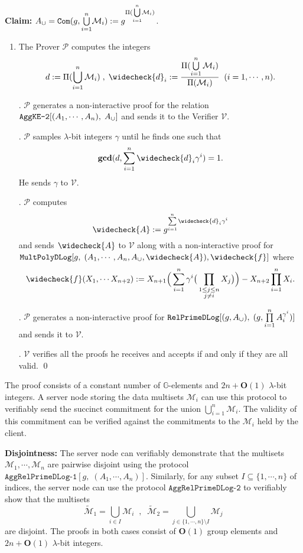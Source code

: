 \documentclass[11pt, lettersize, notitlepage, leqno, footskip=0.6cm]{article}
\newcommand{\pl}{\prod\limits}
\newcommand{\slim}{\sum\limits}
\newcommand{\ttt}{\texttt}
\newcommand{\bG}{\mathbb{G}}
\newcommand{\wti}{\widetilde}
\newcommand{\mc}{\mathcal}
\newcommand{\mbf}{\mathbf}
\newcommand{\sm}{\setminus}
\newcommand{\lam}{\lambda}
\newcommand{\weck}{\widecheck}
\newcommand{\sub}{\subseteq}
\newcommand{\bO}{\mbf{O}}
\newcommand{\mP}{\mc{P}}
\newcommand{\V}{\mc{V}}
\newcommand{\mcM}{\mc{M}}
\newcommand{\vs}{\vspace{-0.15cm}}
\newcommand{\noin}{\noindent}
\newcommand{\GCD}{\mbf{gcd}}
\numberwithin{equation}{section}
\begin{document}
\noin \textbf{Claim:} $A_{\tt{\cup}} = \protect{\verb|Com|}(g, {\bigcup\limits_{i=1}^n} \mc{M}_i) := g^{\Pi({\bigcup\limits_{i=1}^n} \mc{M}_i)}$.

\begin{enumerate}[wide, labelwidth=!, labelindent=0pt]\vs \item The Prover $\mP$ computes the integers \vspace{-0.3cm} $$d:= \Pi(\bigcup\limits_{i=1}^n \mc{M}_i)\;,\;\weck{d}_i:= \frac{\Pi(\bigcup\limits_{i=1}^n \mc{M}_i)}{\Pi(\mcM_i)}\;\;(i=1,\cdots,n).$$

\noin 2. $\mP$ generates a non-interactive proof for the relation $\ttt{AggKE-2}[(A_1,\cdots,A_n),\;A_{\tt{\cup}}]$ and sends it to the Verifier $\V$.


\noin 3. $\mP$ samples $\lam$-bit integers $\gamma$ until he finds one such that \vs $$ \GCD(d, \slim_{i=1}^n \weck{d}_i\gamma^i) =1.$$ He sends $\gamma$ to $\V$.

\noin 4. $\mP$ computes \vs $$\weck{A}:= g^{\slim_{i=1}^n \weck{d}_i\gamma^i}$$ and sends $\weck{A}$ to $\V$ along with a non-interactive proof for $\ttt{MultPolyDLog}[g,\;(A_1,\cdots, A_n, A_{\tt{\cup}}, \weck{A}), \weck{f}]$ where \vs $$\weck{f}(X_1,\cdots X_{n+2}):= X_{n+1}\Big(\slim_{i=1}^n \gamma^i\big(\pl_{\substack{1\leq j\leq n\\ j\neq i}} X_j\big)\Big) - X_{n+2}\pl_{i=1}^n X_i.$$\vs


\noin 5. $\mP$ generates a non-interactive proof for $\ttt{RelPrimeDLog}[(g, A_{\tt{\cup}}),\;(g, \pl_{i=1}^n A_i^{\gamma^i})]$ and sends it to $\V$.

\noin 6. $\V$ verifies all the proofs he receives and accepts if and only if they are all valid. \qed \end{enumerate}

\noin The proof consists of a constant number of $\bG$-elements and $2n+\bO(1)$ $\lam$-bit integers. A server node storing the data multisets $\mcM_i$ can use this protocol to verifiably send the succinct commitment for the union $\bigcup\limits_{i=1}^n \mcM_i$. The validity of this commitment can be verified against the commitments to the $\mcM_i$ held by the client.


\bigskip


\noin \textbf{Disjointness:} The server node can verifiably demonstrate that the multisets $\mcM_1,\cdots,\mcM_n$ are pairwise disjoint using the protocol $\ttt{AggRelPrimeDLog-1}[g,\;(A_1,\cdots,A_n)]$. Similarly, for any subset $I\sub\{1,\cdots,n \}$ of indices, the server node can use the protocol $\ttt{AggRelPrimeDLog-2}$ to verifiably show that the multisets \vs $$\wti{\mcM}_1 = \bigcup\limits_{i\in I}\mcM_i\;\;,\;\;\wti{\mcM}_2 = \bigcup\limits_{j\in \{1,\cdots,n\}\sm I}\mcM_j $$ are disjoint. The proofs in both cases consist of $\bO(1)$ group elements and $2n+\bO(1)$ $\lam$-bit integers.
\end{document}
